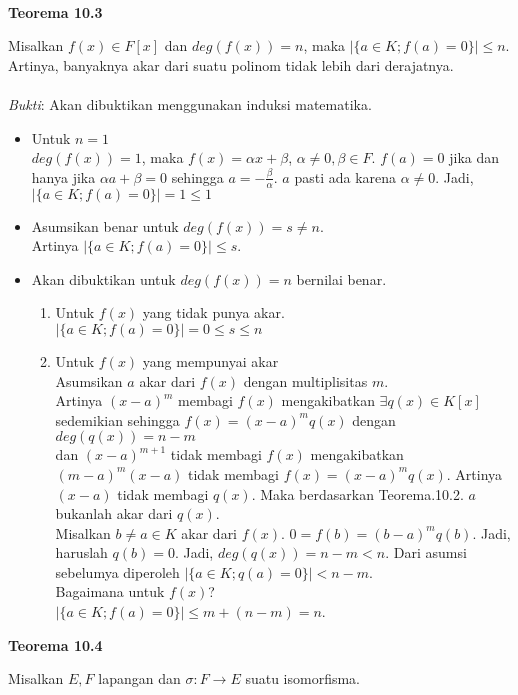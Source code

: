 \\ \textbf{Teorema 10.3}
	\par Misalkan $f(x) \in F[x]$ dan $deg(f(x))=n$, maka $|\{a \in K; f(a)=0\}| \le n$. Artinya, banyaknya akar dari suatu polinom tidak lebih dari derajatnya.\\
\\ \textit{Bukti}: Akan dibuktikan menggunakan induksi matematika.
\begin{itemize}
\item Untuk $n=1$\\
$deg(f(x)) = 1$, maka $f(x) = \alpha x+\beta$, $\alpha \ne 0,\beta \in F$. $f(a)=0$ jika dan hanya jika $\alpha a+\beta=0$ sehingga $a=-\frac{\beta}{\alpha}$. $a$ pasti ada karena $\alpha \ne 0$. Jadi, $|\{a \in K; f(a)=0\}|=1\le1$
\item Asumsikan benar untuk $deg(f(x))=s\ne n$.\\
Artinya $|\{a\in K; f(a)=0\}| \le s$.
\item Akan dibuktikan untuk $deg(f(x))=n$ bernilai benar.\\
\begin{enumerate}
\item Untuk $f(x)$ yang tidak punya akar.\\
$|\{a\in K; f(a)=0\}|=0\le s \le n$
\item Untuk $f(x)$ yang mempunyai akar\\
Asumsikan $a$ akar dari $f(x)$ dengan multiplisitas $m$.\\
Artinya $(x-a)^m$ membagi $f(x)$ mengakibatkan $\exists q(x) \in K[x]$ sedemikian sehingga $f(x)=(x-a)^mq(x)$ dengan $deg(q(x))=n-m$\\
dan $(x-a)^{m+1}$ tidak membagi $f(x)$ mengakibatkan $(m-a)^m(x-a)$ tidak membagi $f(x)=(x-a)^mq(x)$. Artinya $(x-a)$ tidak membagi $q(x)$. Maka berdasarkan Teorema.10.2. $a$ bukanlah akar dari $q(x)$.\\
Misalkan $b \ne a \in K$ akar dari $f(x)$. $0=f(b)=(b-a)^m q(b)$. Jadi, haruslah $q(b)=0$.
Jadi, $deg(q(x))=n-m<n$. Dari asumsi sebelumya diperoleh $|\{a\in K; q(a)=0\}|<n-m$.\\
Bagaimana untuk $f(x)$?\\
$|\{a\in K; f(a)=0\}| \le m+(n-m)=n$.
\end{enumerate}
\end {itemize}
$~$\\ \textbf{Teorema 10.4}
	\par Misalkan $E,F$ lapangan dan $\sigma :F \to E$ suatu isomorfisma.\\
